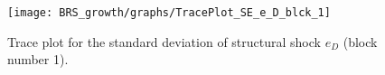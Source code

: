 \begin{figure}[H]
\centering
  \texttt{[image: BRS\_growth/graphs/TracePlot\_SE\_e\_D\_blck\_1]}\\
    \caption{Trace plot for the standard deviation of structural shock ${e_D}$ (block number 1).}
\end{figure}
